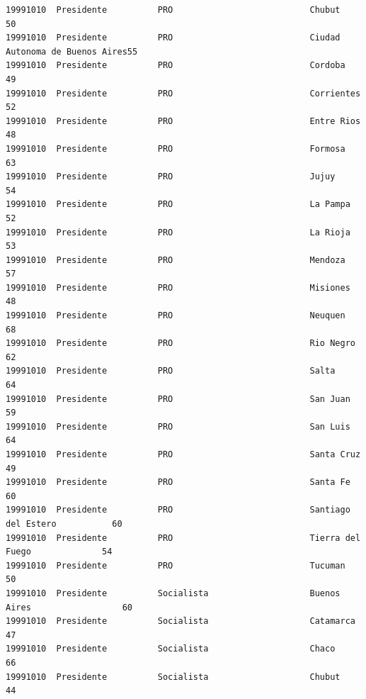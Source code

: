 \documentclass[a4paper,10pt]{article}
\begin{document}
\begin{verbatim}
19991010  Presidente          PRO                           Chubut                        50             
19991010  Presidente          PRO                           Ciudad Autonoma de Buenos Aires55             
19991010  Presidente          PRO                           Cordoba                       49             
19991010  Presidente          PRO                           Corrientes                    52             
19991010  Presidente          PRO                           Entre Rios                    48             
19991010  Presidente          PRO                           Formosa                       63             
19991010  Presidente          PRO                           Jujuy                         54             
19991010  Presidente          PRO                           La Pampa                      52             
19991010  Presidente          PRO                           La Rioja                      53             
19991010  Presidente          PRO                           Mendoza                       57             
19991010  Presidente          PRO                           Misiones                      48             
19991010  Presidente          PRO                           Neuquen                       68             
19991010  Presidente          PRO                           Rio Negro                     62             
19991010  Presidente          PRO                           Salta                         64             
19991010  Presidente          PRO                           San Juan                      59             
19991010  Presidente          PRO                           San Luis                      64             
19991010  Presidente          PRO                           Santa Cruz                    49             
19991010  Presidente          PRO                           Santa Fe                      60             
19991010  Presidente          PRO                           Santiago del Estero           60             
19991010  Presidente          PRO                           Tierra del Fuego              54             
19991010  Presidente          PRO                           Tucuman                       50             
19991010  Presidente          Socialista                    Buenos Aires                  60             
19991010  Presidente          Socialista                    Catamarca                     47             
19991010  Presidente          Socialista                    Chaco                         66             
19991010  Presidente          Socialista                    Chubut                        44             

\end{verbatim}
\end{document}
